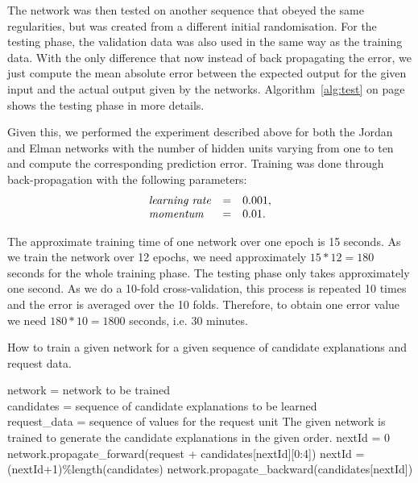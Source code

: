 The network was then tested on another sequence that obeyed the same regularities, but was created from a different initial randomisation. For the testing phase, the validation data was also used in the same way as the training data. With the only difference that now instead of back propagating the error, we just compute the mean absolute error between the expected output for the given input and the actual output given by the networks. Algorithm~\ref{alg:test} on page~\pageref{alg:test} shows the testing phase in more details.

Given this, we performed the experiment described above for both the Jordan and Elman networks with the number of hidden units varying from one to ten and compute the corresponding prediction error. Training was done through back-propagation with the following parameters:
\[ 
\begin{array}{lcl}
\mbox{\textit{learning rate}} &=& 0.001, \\
\mbox{\textit{momentum}} &=& 0.01. 
\end{array}
 \]
 
The approximate training time of one network over one epoch is 15 seconds. As we train the network over 12 epochs, we need approximately $15 * 12 = 180$ seconds for the whole training phase. The testing phase only takes approximately one second. As we do a 10-fold cross-validation, this process is repeated 10 times and the error is averaged over the 10 folds. Therefore, to obtain one error value we need $180 * 10 = 1800$ seconds, i.e. 30 minutes. 

\newpage
\begin{tcolorbox}
\begin{algorithm}
\normalfont
How to train a given network for a given sequence of candidate explanations and request data.
\label{alg:train}
\hfill
\begin{algorithmic}[1]
\REQUIRE network = network to be trained\\
\hspace{0.5cm} candidates = sequence of candidate explanations to be learned\\
\hspace{0.5cm} request\_data = sequence of values for the request unit
\ENSURE The given network is trained to generate the candidate explanations in the given order.
\bigskip
{}
\STATE nextId = 0
	\STATE network.propagate\_forward(request + candidates[nextId][0:4])
		\STATE nextId = (nextId+1)\%length(candidates)
	\ENDIF
	\STATE network.propagate\_backward(candidates[nextId])
\ENDFOR
\ENDWHILE
\end{algorithmic}
\end{algorithm}
\end{tcolorbox}

